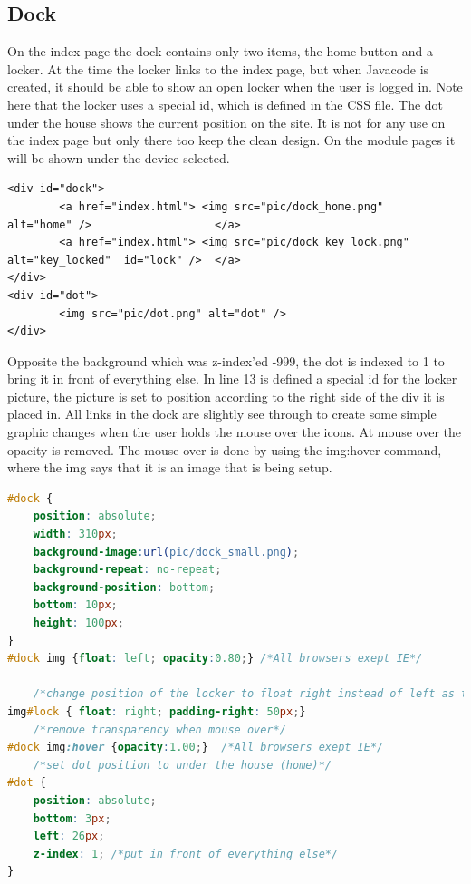 \subsection{Dock}
On the index page the dock contains only two items, the home button and a locker. At the time the locker links to the index page, but when Javacode is created, it should be able to show an open locker when the user is logged in. Note here that the locker uses a special id, which is defined in the CSS file. The dot under the house shows the current position on the site. It is not for any use on the index page but only there too keep the clean design. On the module pages it will be shown under the device selected.  
\begin{lstlisting}
<div id="dock">
		<a href="index.html"> <img src="pic/dock_home.png" 		alt="home" /> 					</a>
		<a href="index.html"> <img src="pic/dock_key_lock.png" 	alt="key_locked"  id="lock" /> 	</a>
</div>
<div id="dot">
		<img src="pic/dot.png" alt="dot" />
</div>
\end{lstlisting}
Opposite the background which was z-index'ed -999, the dot is indexed to 1 to bring it in front of everything else. In line 13 is defined a special id for the locker picture, the picture is set to position according to the right side of the div it is placed in. All links in the dock are slightly see through to create some simple graphic changes when the user holds the mouse over the icons. At mouse over the opacity is removed. The mouse over is done by using the img:hover command, where the img says that it is an image that is being setup.
\begin{lstlisting}[language=CSS]
#dock {
	position: absolute;
	width: 310px;
	background-image:url(pic/dock_small.png);
	background-repeat: no-repeat;
	background-position: bottom;
	bottom: 10px;
	height: 100px;
}
#dock img {float: left; opacity:0.80;} /*All browsers exept IE*/

	/*change position of the locker to float right instead of left as the other link(s)*/
img#lock { float: right; padding-right: 50px;}
	/*remove transparency when mouse over*/
#dock img:hover {opacity:1.00;}  /*All browsers exept IE*/
	/*set dot position to under the house (home)*/
#dot {
	position: absolute;
	bottom: 3px;
	left: 26px;
	z-index: 1; /*put in front of everything else*/
}
\end{lstlisting}
